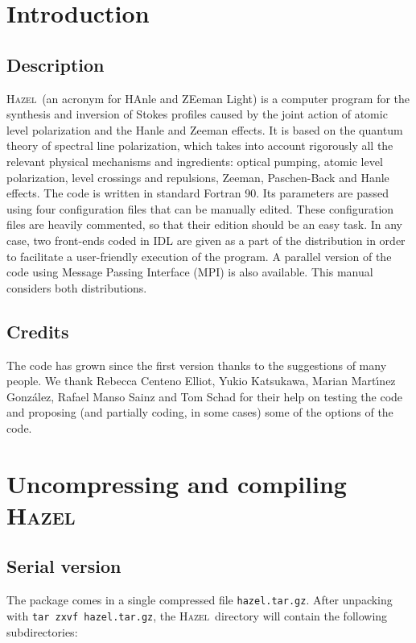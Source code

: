 \documentclass[12pt]{article}
\def\H{\textsc{Hazel}}
\begin{document}
\newpage

\section{Introduction}

\subsection{Description}
\H\ (an acronym for HAnle and ZEeman Light) is a computer program for the synthesis and inversion of Stokes profiles caused by the
joint action of atomic level polarization and the Hanle and Zeeman effects. It is
based on the quantum theory of spectral line polarization, which takes into account
rigorously all the relevant physical mechanisms and ingredients: optical pumping,
atomic level polarization, level crossings and repulsions, Zeeman, Paschen-Back and
Hanle effects. The code is written in standard Fortran 90. Its parameters 
are passed using four configuration files that can be manually edited. These
configuration files are heavily commented, so that their edition should 
be an easy task. In any case, two front-ends coded in IDL are given as a part of the 
distribution in order to facilitate a user-friendly execution of the program.
A parallel version of the code using Message Passing Interface (MPI) is
also available. This manual considers both distributions.

\subsection{Credits}
The code has grown since the first version thanks to the suggestions of many people. We
thank Rebecca Centeno Elliot, Yukio Katsukawa, Marian Mart\'{\i}nez Gonz\'alez, Rafael Manso Sainz and Tom Schad
for their help on testing the code and proposing (and partially coding, in some cases) some of the
options of the code.

\section{Uncompressing and compiling \H}

\subsection{Serial version}
The package comes in a single compressed file \texttt{hazel.tar.gz}. After
unpacking with \texttt{tar zxvf hazel.tar.gz}, the \H\ directory
will contain the following subdirectories:
\end{document}
